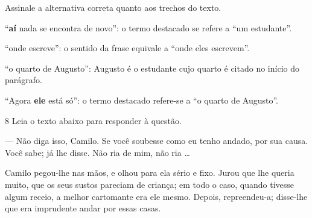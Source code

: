 
Assinale a alternativa correta quanto aos trechos do texto.

\begin{escolha}
    
    \item ``\textbf{aí} nada se encontra de novo'': o termo destacado se refere a ``um estudante''.
    
    \item ``onde escreve'': o sentido da frase equivale a ``onde eles escrevem''.  
    
    \item ``o quarto de Augusto'': Augusto é o estudante cujo quarto é citado no início do parágrafo.  
    
    \item ``Agora \textbf{ele} está só'': o termo destacado refere-se a ``o quarto de Augusto''.   

\end{escolha}

\pagebreak

\num{8} Leia o texto abaixo para responder à questão. 


\begin{myquote}

--- Não diga isso, Camilo. Se você soubesse como eu tenho andado, por sua
causa. Você sabe; já lhe disse. Não ria de mim, não ria \ldots{}

Camilo pegou-lhe nas mãos, e olhou para ela sério e fixo. Jurou que lhe
queria muito, que os seus sustos pareciam de criança; em todo o caso,
quando tivesse algum receio, a melhor cartomante era ele mesmo. Depois,
repreendeu-a; disse-lhe que era imprudente andar por essas casas.

\end{myquote}


